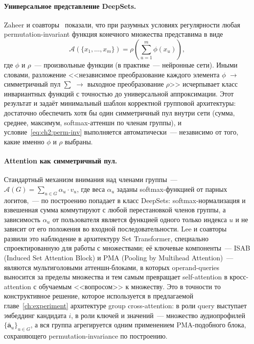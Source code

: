\paragraph{Универсальное представление DeepSets.} Zaheer и соавторы~\cite{zaheer2017deepsets} показали, что при разумных условиях регулярности любая permutation-invariant функция конечного множества представима в виде
\begin{equation}
    \mathcal{A}(\{x_1, \ldots, x_m\}) = \rho\!\left( \sum_{u=1}^{m} \phi(x_u) \right),
    \label{eq:ch2:deepsets}
\end{equation}
где $\phi$ и $\rho$~--- произвольные функции (в практике~--- нейронные сети). Иными словами, разложение <<независимое преобразование каждого элемента $\phi$ $\to$ симметричный пул $\sum$ $\to$ выходное преобразование $\rho$>> исчерпывает класс инвариантных функций с точностью до универсальной аппроксимации. Этот результат и задаёт минимальный шаблон корректной групповой архитектуры: достаточно обеспечить хотя бы один симметричный пул внутри сети (сумма, среднее, максимум, softmax-аттеншн по членам группы), и условие~\eqref{eq:ch2:perm-inv} выполняется автоматически~--- независимо от того, какие именно $\phi$ и $\rho$ выбраны.

\paragraph{Attention как симметричный пул.} Стандартный механизм внимания над членами группы~--- $\mathcal{A}(G) = \sum_{u \in G} \alpha_u \cdot v_u$, где веса $\alpha_u$ заданы softmax-функцией от парных логитов,~--- по построению попадает в класс DeepSets: softmax-нормализация и взвешенная сумма коммутируют с любой перестановкой членов группы, а зависимость $\alpha_u$ от пользователя является функцией одного только индекса $u$ и не зависит от его положения во входной последовательности. Lee и соавторы~\cite{lee2019settransformer} развили это наблюдение в архитектуру Set Transformer, специально спроектированную для работы с множествами; её ключевые компоненты~--- ISAB (Induced Set Attention Block) и PMA (Pooling by Multihead Attention)~--- являются мультиголовыми аттеншн-блоками, в которых operand-queries выносится за пределы множества и тем самым превращает self-attention в кросс-attention с обучаемым <<вопросом>> к множеству. Это в точности то конструктивное решение, которое используется в предлагаемой главе~\ref{ch:experiment} архитектуре group cross-attention: в роли query выступает эмбеддинг кандидата $i$, в роли ключей и значений~--- множество аудиопрофилей $\{\bar{\mathbf{a}}_u\}_{u \in G}$, а вся группа агрегируется одним применением PMA-подобного блока, сохраняющего permutation-invariance по построению.


